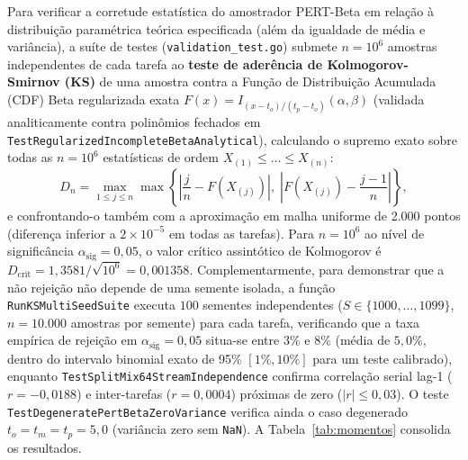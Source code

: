 \documentclass[12pt,openany,oneside,a4paper,english,brazilian,sumario=tradicional]{abntex2}
\begin{document}
Para verificar a corretude estatística do amostrador PERT-Beta em relação à distribuição paramétrica teórica especificada (além da igualdade de média e variância), a suíte de testes (\texttt{validation\_test.go}) submete $n = 10^6$ amostras independentes de cada tarefa ao \textbf{teste de aderência de Kolmogorov-Smirnov (KS)} de uma amostra contra a Função de Distribuição Acumulada (CDF) Beta regularizada exata $F(x) = I_{(x-t_o)/(t_p-t_o)}(\alpha, \beta)$ (validada analiticamente contra polinômios fechados em \texttt{TestRegularized}\allowbreak\texttt{IncompleteBetaAnalytical}), calculando o supremo exato sobre todas as $n = 10^6$ estatísticas de ordem $X_{(1)} \le \dots \le X_{(n)}$:
\begin{equation}
D_n = \max_{1 \le j \le n} \max\!\left\{\left|\frac{j}{n} - F(X_{(j)})\right|,\;\left|F(X_{(j)}) - \frac{j-1}{n}\right|\right\},
\end{equation}
e confrontando-o também com a aproximação em malha uniforme de 2.000 pontos (diferença inferior a $2\times 10^{-5}$ em todas as tarefas). Para $n = 10^6$ ao nível de significância $\alpha_{\mathrm{sig}} = 0{,}05$, o valor crítico assintótico de Kolmogorov é $D_{\mathrm{crit}} = 1{,}3581 / \sqrt{10^6} = 0{,}001358$. Complementarmente, para demonstrar que a não rejeição não depende de uma semente isolada, a função \texttt{RunKSMultiSeedSuite} executa $100$ sementes independentes ($S \in \{1000,\dots,1099\}$, $n=10.000$ amostras por semente) para cada tarefa, verificando que a taxa empírica de rejeição em $\alpha_{\mathrm{sig}}=0{,}05$ situa-se entre $3\%$ e $8\%$ (média de $5{,}0\%$, dentro do intervalo binomial exato de 95\% $[1\%, 10\%]$ para um teste calibrado), enquanto \texttt{TestSplitMix64}\allowbreak\texttt{StreamIndependence} confirma correlação serial lag-1 ($r = -0{,}0188$) e inter-tarefas ($r = 0{,}0004$) próximas de zero ($|r| \le 0{,}03$). O teste \texttt{TestDegeneratePertBeta}\allowbreak\texttt{ZeroVariance} verifica ainda o caso degenerado $t_o = t_m = t_p = 5{,}0$ (variância zero sem \texttt{NaN}). A Tabela~\ref{tab:momentos} consolida os resultados.
\end{document}
